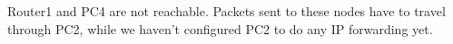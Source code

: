 Router1 and PC4 are not reachable. Packets sent to these nodes have to travel through PC2, while we haven't configured PC2 to do any IP forwarding yet.
